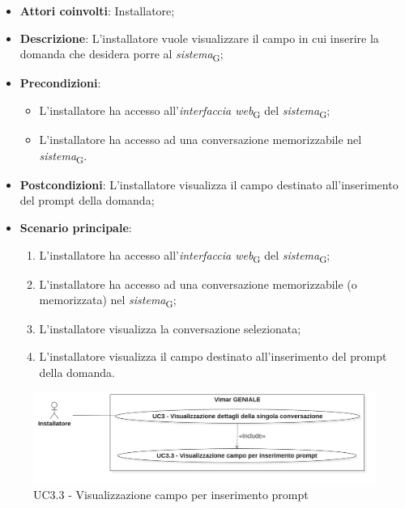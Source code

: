 \begin{itemize}
    \item \textbf{Attori coinvolti}: Installatore;
    \item \textbf{Descrizione}: L'installatore vuole visualizzare il campo in cui inserire la domanda che desidera porre al \textit{sistema}\textsubscript{G};
    \item \textbf{Precondizioni}: 
    \begin{itemize}
        \item L’installatore ha accesso all’\textit{interfaccia web}\textsubscript{G} del \textit{sistema}\textsubscript{G};
        \item L’installatore ha accesso ad una conversazione memorizzabile nel \textit{sistema}\textsubscript{G}.
    \end{itemize}
    \item \textbf{Postcondizioni}: L'installatore visualizza il campo destinato all'inserimento del prompt della domanda;
    \item \textbf{Scenario principale}:
    \begin{enumerate}
        \item L’installatore ha accesso all’\textit{interfaccia web}\textsubscript{G} del \textit{sistema}\textsubscript{G};
        \item L’installatore ha accesso ad una conversazione memorizzabile (o memorizzata) nel \textit{sistema}\textsubscript{G};
        \item L'installatore visualizza la conversazione selezionata;
        \item L'installatore visualizza il campo destinato all'inserimento del prompt della domanda.
    \end{enumerate}
\end{itemize}
\begin{figure}[H]
\centering
\includegraphics[width=1\textwidth]{contents/casi_duso/png/UC3.3.png}
\caption{UC3.3 - Visualizzazione campo per inserimento prompt}
\end{figure}

